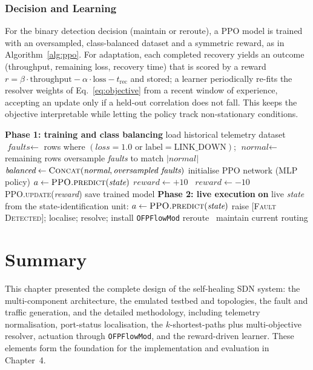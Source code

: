 \documentclass[12pt,a4paper]{report}
\begin{document}
\subsubsection{Decision and Learning}
For the binary detection decision (maintain or reroute), a PPO model is trained with an
oversampled, class-balanced dataset and a symmetric reward, as in
Algorithm~\ref{alg:ppo}. For adaptation, each completed recovery yields an outcome
(throughput, remaining loss, recovery time) that is scored by a reward
$r=\beta\cdot\text{throughput}-\alpha\cdot\text{loss}-t_{\text{rec}}$ and stored; a learner
periodically re-fits the resolver weights of Eq.~\eqref{eq:objective} from a recent window
of experience, accepting an update only if a held-out correlation does not fall. This keeps
the objective interpretable while letting the policy track non-stationary conditions.

\begin{algorithm}[t]
\caption{PPO agent training and autonomous decision execution}
\label{alg:ppo}
\begin{algorithmic}[1]
\State \textbf{Phase 1: training and class balancing}
\State load historical telemetry dataset
\State $\textit{faults} \gets$ rows where $(\textit{loss}=1.0 \text{ or } \text{label}=
\text{LINK\_DOWN})$; $\textit{normal} \gets$ remaining rows
  \State oversample \textit{faults} to match $|\textit{normal}|$
\EndIf
\State $\textit{balanced} \gets \textsc{Concat}(\textit{normal}, \textit{oversampled faults})$
\State initialise PPO network (MLP policy)
  \State $a \gets \textsc{PPO.predict}(\textit{state})$
    \State $\textit{reward} \gets +10$
  \Else\ \State $\textit{reward} \gets -10$ \EndIf
  \State \textsc{PPO.update}(\textit{reward})
\EndFor
\State save trained model
\Statex
\State \textbf{Phase 2: live execution}
\State \textbf{on} live \textit{state} from the state-identification unit:
\State $a \gets \textsc{PPO.predict}(\textit{state})$
 \State raise \textsc{[Fault Detected]}; localise; resolve; install
\texttt{OFPFlowMod} reroute
\Else\ \State maintain current routing \EndIf
\end{algorithmic}
\end{algorithm}

\section{Summary}
This chapter presented the complete design of the self-healing SDN system: the multi-component
architecture, the emulated testbed and topologies, the fault and traffic generation, and the
detailed methodology, including telemetry normalisation, port-status localisation, the
$k$-shortest-paths plus multi-objective resolver, actuation through \texttt{OFPFlowMod}, and
the reward-driven learner. These elements form the foundation for the implementation and
evaluation in Chapter~4.
\end{document}
